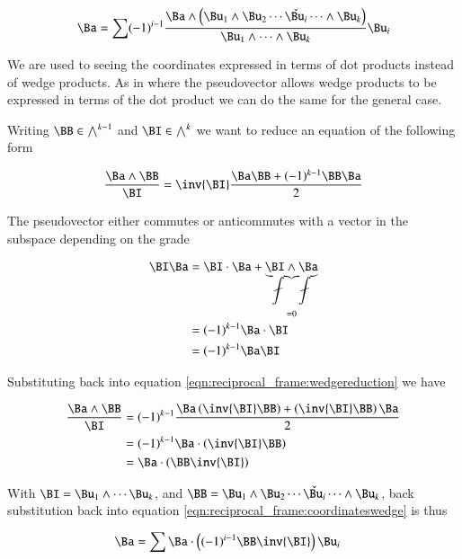 \begin{equation}\label{eqn:reciprocal_frame:coordinateswedge}
\Ba =
\sum(-1)^{i-1} 
\frac{\Ba \wedge \left(\Bu_1 \wedge \Bu_2 \cdots \check{\Bu_i} \cdots \wedge \Bu_k\right)}{ \Bu_1 \wedge \cdots \wedge \Bu_k } \Bu_i
\end{equation}


We are used to seeing the coordinates expressed in terms of dot products instead of wedge products.  As in  where
the pseudovector allows wedge products to be expressed in terms of the dot product we can do the same for the general case.

Writing $\BB \in \bigwedge^{k-1}$ and $\BI \in \bigwedge^k$ we want to reduce an equation of the following form

\begin{equation}\label{eqn:reciprocal_frame:wedgereduction}
\frac{\Ba \wedge \BB}{\BI} = \inv{\BI} \frac{\Ba\BB + (-1)^{k-1}\BB\Ba}{2}
\end{equation}

The pseudovector either commutes or anticommutes with a vector in the subspace depending on the grade

\begin{align*}
\BI \Ba 
&= \BI \cdot \Ba + \underbrace{\BI \wedge \Ba}_{=0} \\
&= (-1)^{k-1}\Ba \cdot \BI \\
&= (-1)^{k-1}\Ba \BI \\
\end{align*}

Substituting back into equation \ref{eqn:reciprocal_frame:wedgereduction} we have

\begin{align*}
\frac{\Ba \wedge \BB}{\BI}
&= (-1)^{k-1} \frac{\Ba \left(\inv{\BI}\BB\right) + \left(\inv{\BI}\BB\right)\Ba}{2} \\
&= (-1)^{k-1} \Ba \cdot \left(\inv{\BI}\BB\right) \\
&= \Ba \cdot \left(\BB \inv{\BI}\right) \\
\end{align*}

With $\BI = \Bu_1 \wedge \cdots \Bu_k$, and $\BB = \Bu_1 \wedge \Bu_2 \cdots \check{\Bu_i} \cdots \wedge \Bu_k$,
back substitution back into equation \ref{eqn:reciprocal_frame:coordinateswedge} is thus

\begin{align*}
\Ba 
&= \sum
\Ba \cdot \left(
(-1)^{i-1} 
\BB \inv{\BI}\right) \Bu_i
\end{align*}

